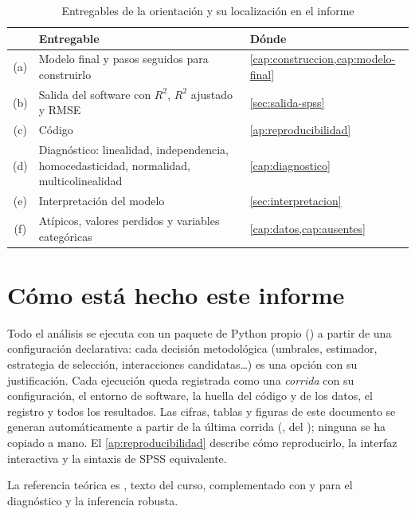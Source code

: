 \begin{table}[htbp]
\centering\small
\caption{Entregables de la orientación y su localización en el informe}\label{tab:entregables}
\begin{tabularx}{\linewidth}{c X l}
\toprule
& Entregable & Dónde \\
\midrule
(a) & Modelo final y pasos seguidos para construirlo & \cref{cap:construccion,cap:modelo-final} \\
(b) & Salida del software con $R^2$, $R^2$ ajustado y RMSE & \cref{sec:salida-spss} \\
(c) & Código & \cref{ap:reproducibilidad} \\
(d) & Diagnóstico: linealidad, independencia, homocedasticidad, normalidad, multicolinealidad & \cref{cap:diagnostico} \\
(e) & Interpretación del modelo & \cref{sec:interpretacion} \\
(f) & Atípicos, valores perdidos y variables categóricas & \cref{cap:datos,cap:ausentes} \\
\bottomrule
\end{tabularx}
\end{table}

\section{Cómo está hecho este informe}

Todo el análisis se ejecuta con un paquete de Python propio () a partir de
una configuración declarativa: cada decisión metodológica (umbrales, estimador, estrategia de
selección, interacciones candidatas\dots) es una opción con su justificación. Cada ejecución
queda registrada como una \emph{corrida} con su configuración, el entorno de software, la
huella del código y de los datos, el registro y todos los resultados. Las cifras, tablas y
figuras de este documento se generan automáticamente a partir de la última corrida
(, del ); ninguna se ha copiado a mano. El
\cref{ap:reproducibilidad} describe cómo reproducirlo, la interfaz interactiva y la sintaxis
de SPSS equivalente.

La referencia teórica es \textcite{wasserman2004}, texto del curso, complementado con
\textcite{fox2016} y \textcite{wooldridge2010} para el diagnóstico y la inferencia robusta.
